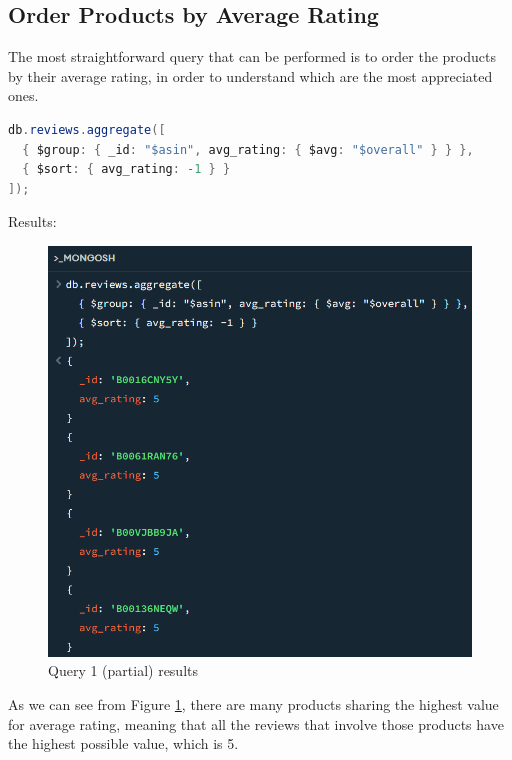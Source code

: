 \subsection{Order Products by Average Rating}
The most straightforward query that can be performed is to order the products by their average rating, in order to understand which are the most appreciated ones. \\
\begin{lstlisting}[language=Java]
db.reviews.aggregate([
  { $group: { _id: "$asin", avg_rating: { $avg: "$overall" } } },
  { $sort: { avg_rating: -1 } }
]);
\end{lstlisting}
Results:
\begin{figure}[H]
  \centering
  \includegraphics[scale=1]{Images/q1_result.png}
  \caption{Query 1 (partial) results}
  \label{fig:q1_result}
\end{figure}
As we can see from Figure \ref{fig:q1_result}, there are many products sharing the highest value for average rating, meaning that all the reviews that involve those products have the highest possible value, which is 5.\\

